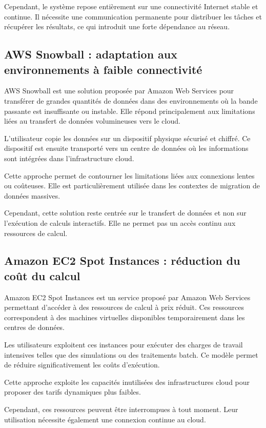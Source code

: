 \documentclass[12pt,a4paper]{report}
\theoremstyle{definition}
\begin{document}
Cependant, le système repose entièrement sur une connectivité Internet stable et continue. Il nécessite une communication permanente pour distribuer les tâches et récupérer les résultats, ce qui introduit une forte dépendance au réseau.

\subsection{AWS Snowball : adaptation aux environnements à faible connectivité}

AWS Snowball est une solution proposée par Amazon Web Services\cite{snowball} pour transférer de grandes quantités de données dans des environnements où la bande passante est insuffisante ou instable. Elle répond principalement aux limitations liées au transfert de données volumineuses vers le cloud.

L’utilisateur copie les données sur un dispositif physique sécurisé et chiffré. Ce dispositif est ensuite transporté vers un centre de données où les informations sont intégrées dans l’infrastructure cloud.

Cette approche permet de contourner les limitations liées aux connexions lentes ou coûteuses. Elle est particulièrement utilisée dans les contextes de migration de données massives.

Cependant, cette solution reste centrée sur le transfert de données et non sur l’exécution de calculs interactifs. Elle ne permet pas un accès continu aux ressources de calcul.

\subsection{Amazon EC2 Spot Instances : réduction du coût du calcul}

Amazon EC2 Spot Instances est un service proposé par Amazon Web \cite{spot}Services permettant d’accéder à des ressources de calcul à prix réduit. Ces ressources correspondent à des machines virtuelles disponibles temporairement dans les centres de données.

Les utilisateurs exploitent ces instances pour exécuter des charges de travail intensives telles que des simulations ou des traitements batch. Ce modèle permet de réduire significativement les coûts d’exécution.

Cette approche exploite les capacités inutilisées des infrastructures cloud pour proposer des tarifs dynamiques plus faibles.

Cependant, ces ressources peuvent être interrompues à tout moment. Leur utilisation nécessite également une connexion continue au cloud.
\end{document}
